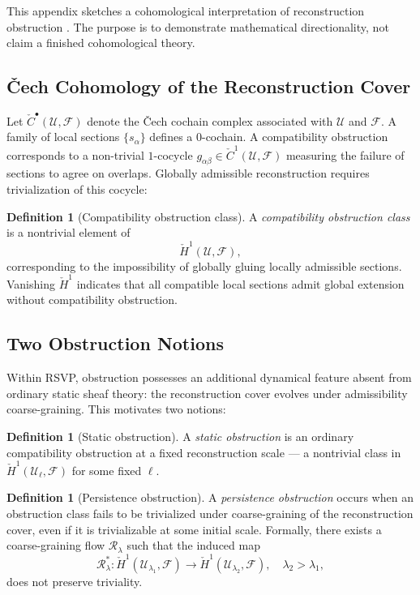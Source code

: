 \documentclass[11pt, a4paper]{article}
\theoremstyle{plain}
\theoremstyle{definition}
\newtheorem{definition}[theorem]{Definition}
\theoremstyle{remark}
\newcommand{\sheaf}{\mathcal{F}}
\newcommand{\Ucover}{\mathcal{U}}
\newcommand{\Rcoarse}{\mathcal{R}_\lambda}
\newcommand{\Hcech}{\check{H}}
\newcommand{\Ccech}{\check{C}}
\begin{document}
This appendix sketches a cohomological interpretation of reconstruction obstruction
\cite{bott1982,hatcher2002,kashiwara2005}. The purpose is to demonstrate
mathematical directionality, not claim a finished cohomological theory.

\subsection{\v{C}ech Cohomology of the Reconstruction Cover}

Let $\Ccech^\bullet(\Ucover, \sheaf)$ denote the \v{C}ech cochain complex associated
with $\Ucover$ and $\sheaf$. A family of local sections $\{s_\alpha\}$ defines a
$0$-cochain. A compatibility obstruction corresponds to a non-trivial $1$-cocycle
$g_{\alpha\beta} \in \Ccech^1(\Ucover, \sheaf)$ measuring the failure of sections to
agree on overlaps. Globally admissible reconstruction requires trivialization of
this cocycle:

\begin{definition}[Compatibility obstruction class]
\label{def:obs-class}
A \emph{compatibility obstruction class} is a nontrivial element of
\[
  \Hcech^1(\Ucover,\sheaf),
\]
corresponding to the impossibility of globally gluing locally admissible sections.
Vanishing $\Hcech^1$ indicates that all compatible local sections admit global
extension without compatibility obstruction.
\end{definition}

\subsection{Two Obstruction Notions}

Within RSVP, obstruction possesses an additional dynamical feature absent from
ordinary static sheaf theory: the reconstruction cover evolves under admissibility
coarse-graining. This motivates two notions:

\begin{definition}[Static obstruction]
A \emph{static obstruction} is an ordinary compatibility obstruction at a fixed
reconstruction scale --- a nontrivial class in $\Hcech^1(\Ucover_\ell, \sheaf)$ for
some fixed $\ell$.
\end{definition}

\begin{definition}[Persistence obstruction]
A \emph{persistence obstruction} occurs when an obstruction class fails to be
trivialized under coarse-graining of the reconstruction cover, even if it is
trivializable at some initial scale. Formally, there exists a coarse-graining flow
$\Rcoarse$ such that the induced map
\[
  \Rcoarse^* \colon \Hcech^1(\Ucover_{\lambda_1}, \sheaf) \longrightarrow
  \Hcech^1(\Ucover_{\lambda_2}, \sheaf), \quad \lambda_2 > \lambda_1,
\]
does not preserve triviality.
\end{definition}
\end{document}
